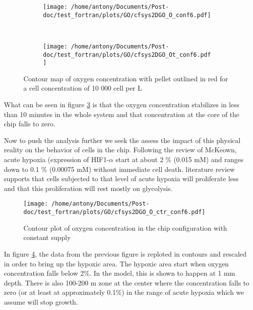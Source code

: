 \documentclass[11pt,a4paper]{article}
\begin{document}
\begin{figure}[ht!]
	\begin{subfigure}{0.45\textwidth}
	\centering
	\texttt{[image: /home/antony/Documents/Post-doc/test\_fortran/plots/GO/cfsys2DGO\_O\_conf6.pdf]}
	\caption{ \label{O_conf5_ct}}
	\end{subfigure}
	~~
	\begin{subfigure}{0.45\textwidth}
	\texttt{[image: /home/antony/Documents/Post-doc/test\_fortran/plots/GO/cfsys2DGO\_Ot\_conf6.pdf]}
		\caption{ \label{Ot_conf5}}
	\end{subfigure}
	\caption{Contour map of oxygen concentration with pellet outlined in red  \label{Oconf6} for a cell concentration of 10 000 cell per \textmu L }
\end{figure}
What can be seen in figure \ref{Oconf6} is that the oxygen concentration stabilizes in less than 10 minutes in the whole system and that concentration at the core of the chip falls to zero.

Now to push the analysis further we seek the assess the impact of this physical reality on the behavior of cells in the chip. Following the review of McKeown, acute hypoxia (expression of HIF1-$\alpha$ start at about 2 \% (0.015 mM) and ranges down to 0.1 \% (0.00075 mM) without immediate cell death.\cite{McKeown2014} literature review supports that cells subjected to that level of acute hypoxia will proliferate less and that this proliferation will rest mostly on glycolysis.\cite{Wigerup2016}\cite{Fuchs2020}\cite{Jiang2016}

\begin{figure}
	\centering
	\texttt{[image: /home/antony/Documents/Post-doc/test\_fortran/plots/GO/cfsys2DGO\_O\_ctr\_conf6.pdf]}
	\caption{ Contour plot of oxygen concentration in the chip configuration with constant supply \label{O_conf6_ct}}
\end{figure}

In figure \ref{O_conf6_ct}, the data from the previous figure is reploted in contours and rescaled in order to bring up the hypoxic area. The hypoxic area start when oxygen concentration falls below 2\%. In the model, this is shown to happen at 1 mm depth. There is also 100-200 \textmu m zone at the center where the concentration falls to zero (or at least at approximately 0.1\%) in the range of acute hypoxia which we assume will stop growth.
\end{document}
